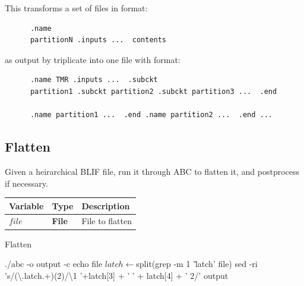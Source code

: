 \documentclass[12pt,final,oneside]{dwThesis} %
\begin{document}
   This transforms a set of files in format: 
   \begin{lstlisting}
      .name
      partitionN .inputs ...  contents 
   \end{lstlisting}

   as output by triplicate
   into one file with format: 
   \begin{lstlisting}
      .name TMR .inputs ...  .subckt
      partition1 .subckt partition2 .subckt partition3 ...  .end

      .name partition1 ...  .end .name partition2 ...  .end ...

   \end{lstlisting}
   \newpage 
   \subsection{Flatten}
   \label{algFlatten} Given a
   heirarchical \gls{BLIF} file, run it through
   \gls{ABC}\cite{abc} to flatten it, and postprocess if
   necessary.  
   \begin{algorithm}

      \begin{center}


         \begin{tabularx}
            {\linewidth}{llX} \toprule Variable & Type &
            Description\\
            \midrule $file$ &\textbf{  File } &  File to
            flatten\\
            \bottomrule 
         \end{tabularx}

      \end{center}

      \caption{Flatten}\label{Flatten} 
      \begin{algorithmic}
         [1]
           
         \State ./abc -o output -c
         echo file  
         \State $latch \gets $split(grep -m 1 '\.latch' file)
         \State sed -ri
         's/(\textbackslash.latch.+)(2)/\textbackslash1 '+latch[3] + ' ' +
         latch[4] + ' 2/' output \EndIf \EndProcedure 
      \end{algorithmic}


   \end{algorithm}
\end{document}
